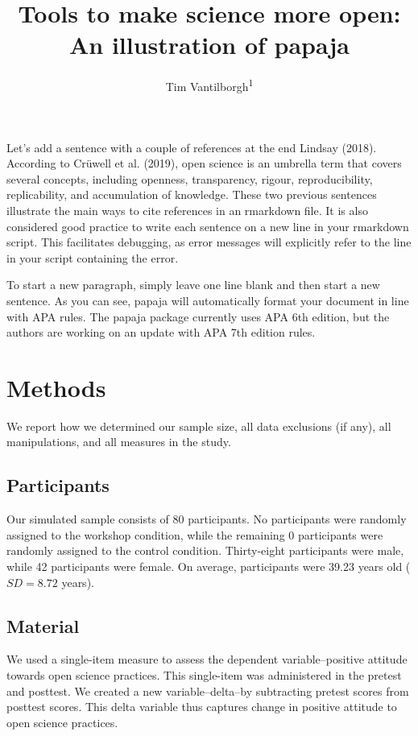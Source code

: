 \documentclass[
  man]{apa6}
\title{Tools to make science more open: An illustration of papaja}
\author{Tim Vantilborgh\textsuperscript{1}}
\date{}
\affiliation{\vspace{0.5cm}\textsuperscript{1} Vrije Universiteit Brussel}
\begin{document}
\maketitle

Let's add a sentence with a couple of references at the end Lindsay (2018).
According to Crüwell et al. (2019), open science is an umbrella term that covers several concepts, including openness, transparency, rigour, reproducibility, replicability, and accumulation of knowledge.
These two previous sentences illustrate the main ways to cite references in an rmarkdown file.
It is also considered good practice to write each sentence on a new line in your rmarkdown script.
This facilitates debugging, as error messages will explicitly refer to the line in your script containing the error.

To start a new paragraph, simply leave one line blank and then start a new sentence.
As you can see, papaja will automatically format your document in line with APA rules.
The papaja package currently uses APA 6th edition, but the authors are working on an update with APA 7th edition rules.

\hypertarget{methods}{%
\section{Methods}\label{methods}}

We report how we determined our sample size, all data exclusions (if any), all manipulations, and all measures in the study.

\hypertarget{participants}{%
\subsection{Participants}\label{participants}}

Our simulated sample consists of 80 participants.
No participants were randomly assigned to the workshop condition, while the remaining 0 participants were randomly assigned to the control condition.
Thirty-eight participants were male, while 42 participants were female.
On average, participants were 39.23 years old (\(SD = 8.72\) years).

\hypertarget{material}{%
\subsection{Material}\label{material}}

We used a single-item measure to assess the dependent variable--positive attitude towards open science practices.
This single-item was administered in the pretest and posttest.
We created a new variable--delta--by subtracting pretest scores from posttest scores.
This delta variable thus captures change in positive attitude to open science practices.
\end{document}
